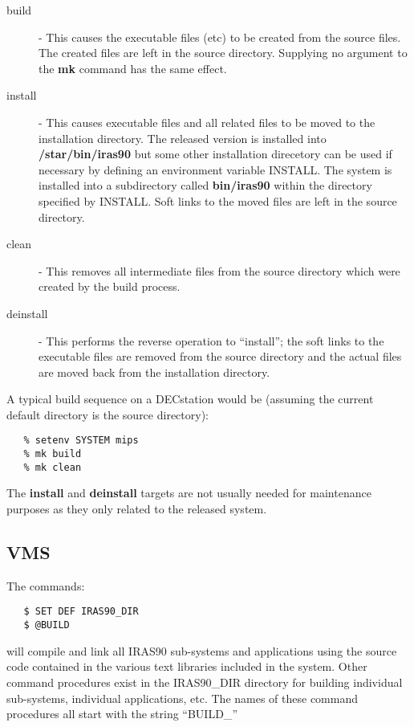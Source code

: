 \begin{description}
\item [build] - This causes the executable files (etc) to be created from the
source files. The created files are left in the source directory. Supplying no
argument to the {\bf mk} command has the same effect. 

\item [install] - This causes executable files and all related files to be moved
to the installation directory. The released version is installed into {\bf
/star/bin/iras90} but some other installation direcetory can be used if
necessary by defining an environment variable {\small INSTALL}. The system is
installed into a subdirectory called {\bf bin/iras90} within the directory
specified by {\small INSTALL}. Soft links to the moved files are left in the
source directory. 

\item [clean] - This removes all intermediate files from the source directory 
which were created by the build process.

\item [deinstall] - This performs the reverse operation to ``install''; the soft
links to the executable files are removed from the source directory and the
actual files are moved back from the installation directory.

\end{description}

A typical build sequence on a DECstation would be (assuming the current default 
directory is the source directory):

\small
\begin{verbatim}
   % setenv SYSTEM mips
   % mk build
   % mk clean
\end{verbatim}
\normalsize

The {\bf install} and {\bf deinstall} targets are not usually needed for
maintenance purposes as they only related to the released system. 


\subsection{VMS}
The commands:

\small
\begin{verbatim}
   $ SET DEF IRAS90_DIR
   $ @BUILD
\end{verbatim}
\normalsize

will compile and link all {\small IRAS90} sub-systems and applications using the
source code contained in the various text libraries included in the system.
Other command procedures exist in the {\small IRAS90\_DIR} directory for
building individual sub-systems, individual applications, etc. The names of
these command procedures all start with the string ``{\small BUILD\_}'' 

